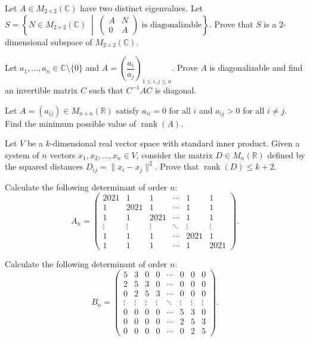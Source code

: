 \documentclass[12pt]{article}
\begin{document}
\begin{problem}
Let $A\in M_{2\times 2}(\mathbb{C})$ have two distinct eigenvalues. Let
 $S=\left\{N\in M_{2\times 2}(\mathbb{C}) \;\middle|\; \begin{pmatrix}A & N\\ 0 & A\end{pmatrix} \text{ is diagonalizable}\right\}$.
Prove that $S$ is a $2$-dimensional subspace of $M_{2\times 2}(\mathbb{C})$.
\end{problem}

\begin{problem}
Let $a_1,\dots,a_n\in\mathbb{C}\setminus\{0\}$ and $A=\left(\dfrac{a_i}{a_j}\right)_{1\le i,j\le n}$. Prove $A$ is diagonalizable and find an invertible matrix $C$ such that $C^{-1}AC$ is diagonal.
\end{problem}

\begin{problem}
Let $A=(a_{ij})\in M_{n\times n}(\mathbb{R})$ satisfy $a_{ii}=0$ for all $i$ and $a_{ij}>0$ for all $i\ne j$. Find the minimum possible value of $\operatorname{rank}(A)$.
\end{problem}

\begin{problem}
Let $V$ be a $k$-dimensional real vector space with standard inner product. Given a system of $n$ vectors $x_1,x_2,\dots,x_n\in V$, consider the matrix $D\in M_n(\mathbb{R})$ defined by the squared distances $D_{ij}=\|x_i-x_j\|^2$. Prove that $\operatorname{rank}(D)\le k+2$.
\end{problem}

\begin{problem}
Calculate the following determinant of order $n$:
\[
A_n=\begin{pmatrix}
2021 & 1 & 1 & \cdots & 1 & 1\\
1 & 2021 & 1 & \cdots & 1 & 1\\
1 & 1 & 2021 & \cdots & 1 & 1\\
\vdots & \vdots & \vdots & \ddots & \vdots & \vdots\\
1 & 1 & 1 & \cdots & 2021 & 1\\
1 & 1 & 1 & \cdots & 1 & 2021
\end{pmatrix}.
\]
\end{problem}

\begin{problem}
Calculate the following determinant of order $n$:
\[
B_n=\begin{pmatrix}
5 & 3 & 0 & 0 & \cdots & 0 & 0 & 0\\
2 & 5 & 3 & 0 & \cdots & 0 & 0 & 0\\
0 & 2 & 5 & 3 & \cdots & 0 & 0 & 0\\
\vdots & \vdots & \vdots & \vdots & \ddots & \vdots & \vdots & \vdots\\
0 & 0 & 0 & 0 & \cdots & 5 & 3 & 0\\
0 & 0 & 0 & 0 & \cdots & 2 & 5 & 3\\
0 & 0 & 0 & 0 & \cdots & 0 & 2 & 5
\end{pmatrix}.
\]
\end{problem}
\end{document}
